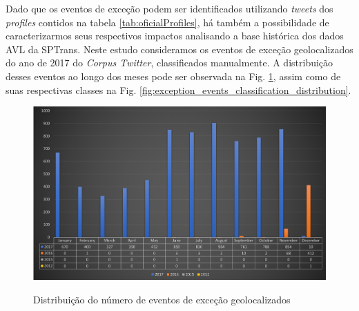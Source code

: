 \documentclass[
	12pt,				%
	oneside,			%
	a4paper,			%
	english,			%
	brazil				%
	]{abntex2ppgsi}
\begin{document}
Dado que os eventos de exceção podem ser identificados utilizando \textit{tweets} dos \textit{profiles} contidos na tabela \ref{tab:oficialProfiles}, há também a possibilidade de caracterizarmos seus respectivos impactos analisando a base histórica dos dados AVL da SPTrans.  Neste estudo consideramos os eventos de exceção geolocalizados do ano de 2017 do \textit{Corpus Twitter}, classificados manualmente. A distribuição desses eventos ao longo dos meses pode ser observada  na Fig. \ref{fig:geolocated_exception_events_distribution}, assim como de suas respectivas classes na Fig. \ref{fig:exception_events_classification_distribution}.



\begin{figure}[!htb]
	\centering
 	  \caption{Distribuição do número de eventos de exceção geolocalizados}
		\includegraphics[width=1\linewidth]{images/geolocated_exception_events_distribution.png}
	\label{fig:geolocated_exception_events_distribution}
\end{figure}
\end{document}
